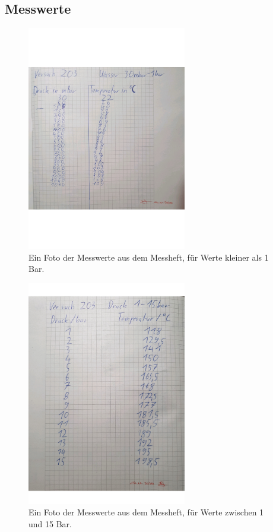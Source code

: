 \subsection{Messwerte}
\begin{figure}[H]
    \centering
    \includegraphics[width=0.62\textwidth]{images/Messwerte1_V203.pdf}
    \caption{Ein Foto der Messwerte aus dem Messheft, für Werte kleiner als 1 Bar.}
    \label{img:fotomess1}
\end{figure}

\begin{figure}[H]
    \centering
    \includegraphics[width=0.62\textwidth]{images/Messwerte2_V203.pdf}
    \caption{Ein Foto der Messwerte aus dem Messheft, für Werte zwischen 1 und 15 Bar.}
    \label{img:fotomess2}
\end{figure}

